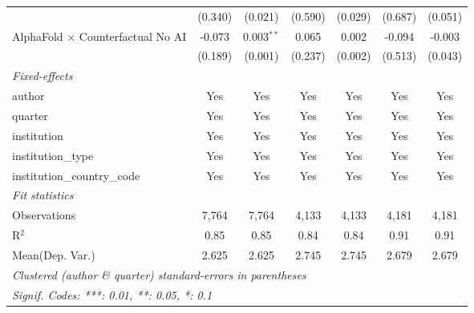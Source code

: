 \begin{tabular}{lcccccc}
                                            & (0.340)       & (0.021)        & (0.590)      & (0.029)       & (0.687) & (0.051)\\   
   AlphaFold $\times$ Counterfactual No AI  & -0.073        & 0.003$^{**}$   & 0.065        & 0.002         & -0.094  & -0.003\\   
                                            & (0.189)       & (0.001)        & (0.237)      & (0.002)       & (0.513) & (0.043)\\   
   \midrule
   \emph{Fixed-effects}\\
   author                                   & Yes           & Yes            & Yes          & Yes           & Yes     & Yes\\  
   quarter                                  & Yes           & Yes            & Yes          & Yes           & Yes     & Yes\\  
   institution                              & Yes           & Yes            & Yes          & Yes           & Yes     & Yes\\  
   institution\_type                        & Yes           & Yes            & Yes          & Yes           & Yes     & Yes\\  
   institution\_country\_code               & Yes           & Yes            & Yes          & Yes           & Yes     & Yes\\  
   \midrule
   \emph{Fit statistics}\\
   Observations                             & 7,764         & 7,764          & 4,133        & 4,133         & 4,181   & 4,181\\  
   R$^2$                                    & 0.85          & 0.85           & 0.84         & 0.84          & 0.91    & 0.91\\  
Mean(Dep. Var.) & 2.625 & 2.625 & 2.745 & 2.745 & 2.679 & 2.679 \\
   \midrule \midrule
   \multicolumn{7}{l}{\emph{Clustered (author \& quarter) standard-errors in parentheses}}\\
   \multicolumn{7}{l}{\emph{Signif. Codes: ***: 0.01, **: 0.05, *: 0.1}}\\
\end{tabular}
\par\endgroup
